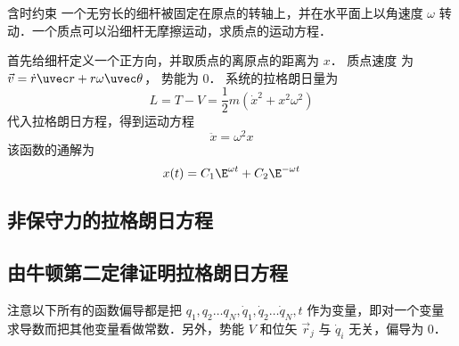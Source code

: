 \begin{exam}{含时约束}
一个无穷长的细杆被固定在原点的转轴上，并在水平面上以角速度 $\omega$ 转动．一个质点可以沿细杆无摩擦运动，求质点的运动方程．

首先给细杆定义一个正方向，并取质点的离原点的距离为 $x$． 质点速度%
为 $\vec v = \dot r \uvec r + r\omega \uvec\theta$， 势能为 0． 系统的拉格朗日量为
\begin{equation}
L = T - V = \frac{1}{2}m({\dot x^2} + {x^2}{\omega^2})
\end{equation}
代入拉格朗日方程，得到运动方程
\begin{equation}
\ddot x = {\omega ^2} x
\end{equation}
该函数的通解为%
\begin{equation}
x(t) = {C_1}{\E^{\omega t}} + {C_2}{\E^{ - \omega t}}
\end{equation}
\end{exam}

\subsection{非保守力的拉格朗日方程}




\subsection{由牛顿第二定律证明拉格朗日方程}
注意以下所有的函数偏导都是把 ${q_1},{q_2}\dots{q_N},{{\dot q}_1},{{\dot q}_2}\dots{{\dot q}_N},t$ 作为变量，即对一个变量求导数而把其他变量看做常数．另外，势能 $V$ 和位矢 $\vec r_j$ 与 $\dot q_i$ 无关，偏导为 0．


